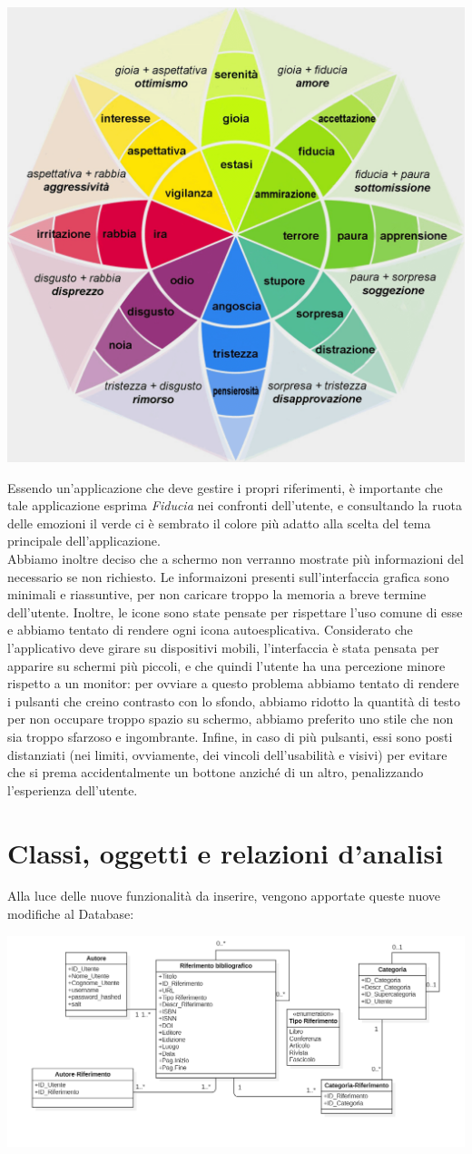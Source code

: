         \begin{center}
            \includegraphics[width=.40\textwidth]{Immagini/Ruota di Plutchik.png} 
        \end{center}
Essendo un'applicazione che deve gestire i propri riferimenti, è importante che tale applicazione esprima \textit{Fiducia} nei confronti dell'utente, e consultando la ruota delle emozioni il verde ci è sembrato il colore più adatto alla scelta del tema principale dell'applicazione. \\
Abbiamo inoltre deciso che a schermo non verranno mostrate più informazioni del necessario se non richiesto. Le informaizoni presenti sull'interfaccia grafica sono minimali e riassuntive, per non caricare troppo la memoria a breve termine dell'utente. Inoltre, le icone sono state pensate per rispettare l'uso comune di esse e abbiamo tentato di rendere ogni icona autoesplicativa. Considerato che l'applicativo deve girare su dispositivi mobili, l'interfaccia è stata pensata per apparire su schermi più piccoli, e che quindi l'utente ha una percezione minore rispetto a un monitor: per ovviare a questo problema abbiamo tentato di rendere i pulsanti che creino contrasto con lo sfondo, abbiamo ridotto la quantità di testo per non occupare troppo spazio su schermo, abbiamo preferito uno stile che non sia troppo sfarzoso e ingombrante. Infine, in caso di più pulsanti, essi sono posti distanziati (nei limiti, ovviamente, dei vincoli dell'usabilità e visivi) per evitare che si prema accidentalmente un bottone anziché di un altro, penalizzando l'esperienza dell'utente.

\raggedright{\section{Classi, oggetti e relazioni d'analisi}}
Alla luce delle nuove funzionalità da inserire, vengono apportate queste nuove modifiche al Database: 

        \begin{center}
            \includegraphics[width=.90\textwidth]{Immagini/Alexandria/UML DB.PNG} 
        \end{center}
        
